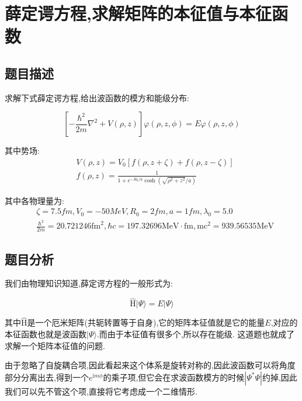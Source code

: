 
\chapter{薛定谔方程,求解矩阵的本征值与本征函数}

\section{题目描述}

求解下式薛定谔方程,给出波函数的模方和能级分布:

\begin{equation}
\left[ - \frac { \hbar ^ { 2 } } { 2 m } \nabla ^ { 2 } + V ( \rho , z ) \right] \varphi ( \rho , z , \phi ) = E \varphi ( \rho , z , \phi )
\end{equation}

其中势场:
\begin{align} 
&  V ( \rho , z ) = V_0[ f ( \rho , z + \zeta ) + f ( \rho , z - \zeta ) ] \\ 
&{ f ( \rho , z ) = \frac { 1 } { 1 + e ^ { - R _ { 0 } / a } \cosh \left( \sqrt { \rho ^ { 2 } + z ^ { 2 } } / a \right) } } 
\end{align}

其中各物理量为:
\begin{align}
&{ \zeta = 7.5 f m , V _ { 0 } = - 50 M e V , R _ { 0 } = 2 f m , a = 1 f m , \lambda _ { 0 } = 5.0 } \\
 &{ \frac { \hbar ^ { 2 } } { 2 m } = 20.721246 \mathrm { fm } ^ { 2 } , \hbar c = 197.32696 \mathrm { MeV } \cdot \mathrm { fm } , \mathrm { mc } ^ { 2 } = 939.56535 \mathrm { MeV } } 
 \end{align}
 
\section{题目分析}
 
 我们由物理知识知道,薛定谔方程的一般形式为:
 
 \begin{equation}
 \hat { \mathrm { H } } | \Psi \rangle = E | \Psi \rangle
 \end{equation}
 
 其中$\hat { \mathrm { H } } $是一个厄米矩阵(共轭转置等于自身),它的矩阵本征值就是它的能量$E$,对应的本征函数也就是波函数$| \Psi \rangle$.而由于本征值有很多个,所以存在能级. 这道题也就成了求解一个矩阵本征值的问题.
 
由于忽略了自旋耦合项,因此看起来这个体系是旋转对称的,因此波函数可以将角度部分分离出去,得到一个$e^{\mathrm{i}m\phi}$的乘子项,但它会在求波函数模方的时候$|\Psi^*\Psi|$约掉,因此我们可以先不管这个项,直接将它考虑成一个二维情形.

